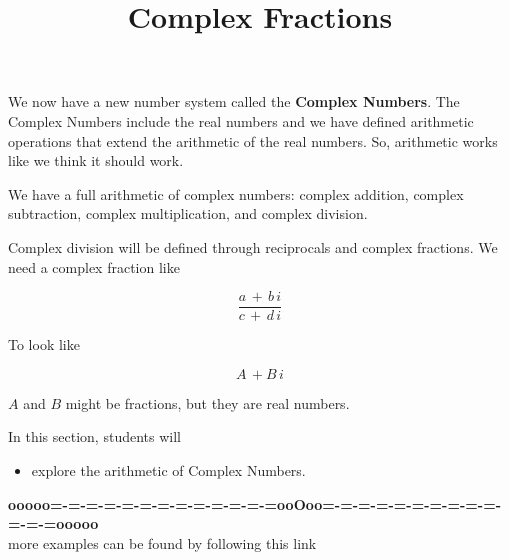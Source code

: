 \documentclass{ximera}
\title{Complex Fractions}
\begin{document}
\begin{abstract}
\end{abstract}
\maketitle







We now have a new number system called the \textbf{Complex Numbers}.  The Complex Numbers include the real numbers and we have defined arithmetic operations that extend the arithmetic of the real numbers.  So, arithmetic works like we think it should work.

We have a full arithmetic of complex numbers: complex addition, complex subtraction, complex multiplication, and complex division.



Complex division will be defined through reciprocals and complex fractions.  We need a complex fraction like

\[  \frac{a \, + \, b \, i}{c \, + \, d \, i}     \]


To look like

\[  A \, + B \, i    \]

$A$ and $B$ might be fractions, but they are real numbers.




\begin{sectionOutcomes}
In this section, students will 

\begin{itemize}
\item explore the arithmetic of Complex Numbers.
\end{itemize}
\end{sectionOutcomes}











\begin{center}
\textbf{\textcolor{green!50!black}{ooooo=-=-=-=-=-=-=-=-=-=-=-=-=ooOoo=-=-=-=-=-=-=-=-=-=-=-=-=ooooo}} \\

more examples can be found by following this link\\ 

\end{center}
\end{document}

